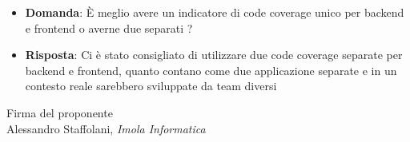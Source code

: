 \documentclass[a4paper, 11pt]{article}
\begin{document}
\begin{itemize}
\item \textbf{Domanda}: È meglio avere un indicatore di code coverage unico per backend e frontend o averne due separati ?
\item \textbf{Risposta}: Ci è stato consigliato di utilizzare due code coverage separate per backend e frontend, quanto contano come due applicazione separate e in un contesto reale sarebbero sviluppate da team diversi
\end{itemize}

\vspace{60pt}
\begin{flushleft}
\hfill Firma del proponente \\
\vspace{50pt}
\hfill Alessandro Staffolani, \textit{Imola Informatica}
\end{flushleft}
\end{document}
